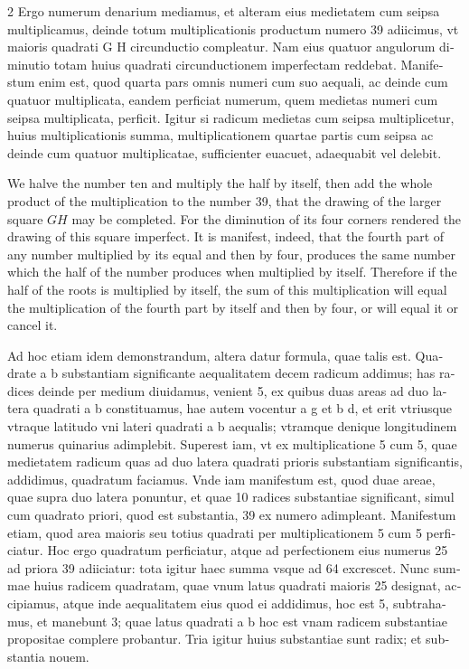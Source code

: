 \documentclass[11pt,a4paper,twoside]{book}
\newcommand{\latincolumn}[1]{\textlatin{\small #1}}
\begin{document}
\begin{paracol}{2}
\latincolumn{Ergo numerum denarium mediamus, et alteram eius medietatem cum seipsa multiplicamus, deinde totum multiplicationis productum numero 39 adiicimus, vt maioris quadrati G H circunductio compleatur. Nam eius quatuor angulorum diminutio totam huius quadrati circunductionem imperfectam reddebat. Manifestum enim est, quod quarta pars omnis numeri cum suo aequali, ac deinde cum quatuor multiplicata, eandem perficiat numerum, quem medietas numeri cum seipsa multiplicata, perficit. Igitur si radicum medietas cum seipsa multiplicetur, huius multiplicationis summa, multiplicationem quartae partis cum seipsa ac deinde cum quatuor multiplicatae, sufficienter euacuet, adaequabit vel delebit.}

\switchcolumn

We halve the number ten and multiply the half by itself, then add the whole product of the multiplication to the number 39, that the drawing of the larger square $GH$ may be completed. For the diminution of its four corners rendered the drawing of this square imperfect. It is manifest, indeed, that the fourth part of any number multiplied by its equal and then by four, produces the same number which the half of the number produces when multiplied by itself. Therefore if the half of the roots is multiplied by itself, the sum of this multiplication will equal the multiplication of the fourth part by itself and then by four, or will equal it or cancel it.

\switchcolumn*

\latincolumn{Ad hoc etiam idem demonstrandum, altera datur formula, quae talis est. Quadrate a b substantiam significante aequalitatem decem radicum addimus; has radices deinde per medium diuidamus, venient 5, ex quibus duas areas ad duo latera quadrati a b constituamus, hae autem vocentur a g et b d, et erit vtriusque vtraque latitudo vni lateri quadrati a b aequalis; vtramque denique longitudinem numerus quinarius adimplebit. Superest iam, vt ex multiplicatione 5 cum 5, quae medietatem radicum quas ad duo latera quadrati prioris substantiam significantis, addidimus, quadratum faciamus. Vnde iam manifestum est, quod duae areae, quae supra duo latera ponuntur, et quae 10 radices substantiae significant, simul cum quadrato priori, quod est substantia, 39 ex numero adimpleant. Manifestum etiam, quod area maioris seu totius quadrati per multiplicationem 5 cum 5 perficiatur. Hoc ergo quadratum perficiatur, atque ad perfectionem eius numerus 25 ad priora 39 adiiciatur: tota igitur haec summa vsque ad 64 excrescet. Nunc summae huius radicem quadratam, quae vnum latus quadrati maioris 25 designat, accipiamus, atque inde aequalitatem eius quod ei addidimus, hoc est 5, subtrahamus, et manebunt 3; quae latus quadrati a b hoc est vnam radicem substantiae propositae complere probantur. Tria igitur huius substantiae sunt radix; et substantia nouem.}


\end{paracol}
\end{document}
